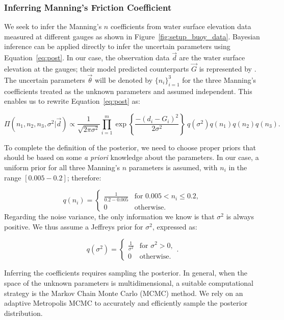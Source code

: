 \subsubsection{Inferring Manning's Friction Coefficient}
\label{sec:infmanning}
 
We seek to infer the Manning's $n$ coefficients from water surface elevation
data measured at different gauges as shown in Figure~\ref{fig:setup_buoy_data}.
Bayesian inference can be applied directly to infer the uncertain parameters
using Equation~\eqref{eq:post}. In our case, the observation data $\vec d$ 
are the water surface elevation at the gauges;
their model predicted counterparts $\vec G$ is represented by \geoclaw.
The uncertain parameters $\vec \theta$ will be denoted by $\{n_i\}_{i=1}^3$ for the
three Manning's coefficients treated as the unknown parameters and assumed independent. 
This enables us to rewrite Equation~\eqref{eq:post} as:

\begin{equation} 
\Pi(n_1,n_2,n_3,\sigma^2 | \vec d) 
\propto \frac{1}{\sqrt{2 \pi \sigma^2}} 
 \prod_{i=1}^m  
\exp \left\lbrace \frac{-(d_i - G_i)^2}{2 \sigma^2} \right\rbrace
\ q(\sigma^2)q(n_1)q(n_2) q(n_3).
\label{eq:post_coef}
\end{equation}

To complete the definition of the posterior, we need to choose proper priors that should be based 
on some \emph{a priori} knowledge about the parameters. In our case, a uniform
prior for all three Manning's $n$ parameters is assumed, with $n_i$ in the range  $[0.005 - 0.2]$; therefore:

\begin{equation} 
q(n_i) = \begin{cases}
		\displaystyle \frac{1}{0.2-0.005} &\text{for~} 0.005 <  n_i \leq 0.2 ,  \\
		0 &\text{otherwise}.
\end{cases}
\end{equation}
Regarding the noise variance, the only information we know 
is that $\sigma^2$ is always positive.
We thus assume a Jeffreys prior \citep{sivia} for $\sigma^2$, expressed as:

\begin{equation} 
q(\sigma^2) =  \begin{cases}
		\displaystyle \frac{1}{\sigma^2} &\text{for~} \sigma^2 > 0,  \\
		0 &\text{otherwise}. 
		\end{cases}.
\label{eq:var_pr}
\end{equation}

Inferring the coefficients requires 
sampling the posterior. In general, when the space of the unknown 
parameters is multidimensional, a suitable computational strategy is 
the Markov Chain Monte  Carlo (MCMC) method. 
We rely on an adaptive Metropolis MCMC \citep{Gareth2009,Haario2001} to
accurately and efficiently sample the posterior distribution.


